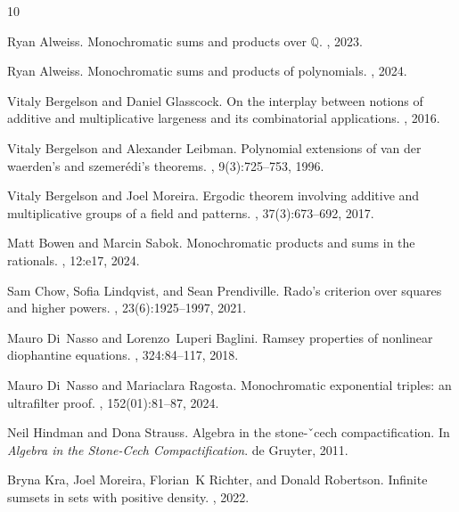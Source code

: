 \begin{thebibliography}{10}

Ryan Alweiss.
\newblock Monochromatic sums and products over $\mathbb{Q}$.
, 2023.

Ryan Alweiss.
\newblock Monochromatic sums and products of polynomials.
, 2024.

Vitaly Bergelson and Daniel Glasscock.
\newblock On the interplay between notions of additive and multiplicative
  largeness and its combinatorial applications.
, 2016.

Vitaly Bergelson and Alexander Leibman.
\newblock Polynomial extensions of van der waerden’s and szemer{\'e}di’s
  theorems.
, 9(3):725--753,
  1996.

Vitaly Bergelson and Joel Moreira.
\newblock Ergodic theorem involving additive and multiplicative groups of a
  field and patterns.
, 37(3):673--692, 2017.

Matt Bowen and Marcin Sabok.
\newblock Monochromatic products and sums in the rationals.
, 12:e17, 2024.

Sam Chow, Sofia Lindqvist, and Sean Prendiville.
\newblock Rado's criterion over squares and higher powers.
, 23(6):1925--1997,
  2021.

Mauro Di~Nasso and Lorenzo~Luperi Baglini.
\newblock Ramsey properties of nonlinear diophantine equations.
, 324:84--117, 2018.

Mauro Di~Nasso and Mariaclara Ragosta.
\newblock Monochromatic exponential triples: an ultrafilter proof.
,
  152(01):81--87, 2024.

Neil Hindman and Dona Strauss.
\newblock Algebra in the stone-ˇcech compactification.
\newblock In {\em Algebra in the Stone-Cech Compactification}. de Gruyter,
  2011.

Bryna Kra, Joel Moreira, Florian~K Richter, and Donald Robertson.
\newblock Infinite sumsets in sets with positive density.
, 2022.


\end{thebibliography}

